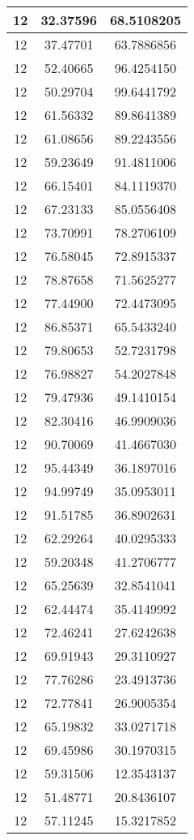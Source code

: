 \documentclass[
]{book}
\begin{document}
\begin{tabular}{c|c|c}
\hline
12 & 32.37596 & 68.5108205\\
\hline
12 & 37.47701 & 63.7886856\\
\hline
12 & 52.40665 & 96.4254150\\
\hline
12 & 50.29704 & 99.6441792\\
\hline
12 & 61.56332 & 89.8641389\\
\hline
12 & 61.08656 & 89.2243556\\
\hline
12 & 59.23649 & 91.4811006\\
\hline
12 & 66.15401 & 84.1119370\\
\hline
12 & 67.23133 & 85.0556408\\
\hline
12 & 73.70991 & 78.2706109\\
\hline
12 & 76.58045 & 72.8915337\\
\hline
12 & 78.87658 & 71.5625277\\
\hline
12 & 77.44900 & 72.4473095\\
\hline
12 & 86.85371 & 65.5433240\\
\hline
12 & 79.80653 & 52.7231798\\
\hline
12 & 76.98827 & 54.2027848\\
\hline
12 & 79.47936 & 49.1410154\\
\hline
12 & 82.30416 & 46.9909036\\
\hline
12 & 90.70069 & 41.4667030\\
\hline
12 & 95.44349 & 36.1897016\\
\hline
12 & 94.99749 & 35.0953011\\
\hline
12 & 91.51785 & 36.8902631\\
\hline
12 & 62.29264 & 40.0295333\\
\hline
12 & 59.20348 & 41.2706777\\
\hline
12 & 65.25639 & 32.8541041\\
\hline
12 & 62.44474 & 35.4149992\\
\hline
12 & 72.46241 & 27.6242638\\
\hline
12 & 69.91943 & 29.3110927\\
\hline
12 & 77.76286 & 23.4913736\\
\hline
12 & 72.77841 & 26.9005354\\
\hline
12 & 65.19832 & 33.0271718\\
\hline
12 & 69.45986 & 30.1970315\\
\hline
12 & 59.31506 & 12.3543137\\
\hline
12 & 51.48771 & 20.8436107\\
\hline
12 & 57.11245 & 15.3217852\\

\end{tabular}
\end{document}
